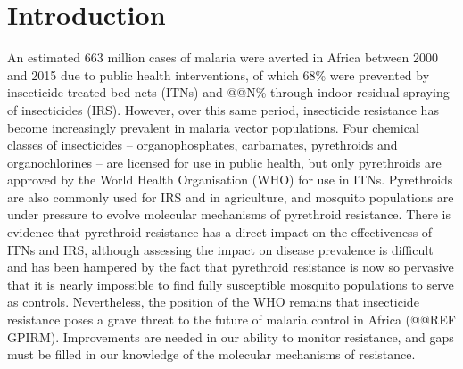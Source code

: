 \documentclass[a4paper,11pt,abstracton]{scrartcl}
\begin{document}
\section*{Introduction}

An estimated 663 million cases of malaria were averted in Africa between 2000 and 2015 due to public health interventions, of which 68\% were prevented by insecticide-treated bed-nets (ITNs) and @@N\% through indoor residual spraying of insecticides (IRS).
%
However, over this same period, insecticide resistance has become increasingly prevalent in malaria vector populations.
%
Four chemical classes of insecticides -- organophosphates, carbamates, pyrethroids and organochlorines -- are licensed for use in public health, but only pyrethroids are approved by the World Health Organisation (WHO) for use in ITNs.
%
Pyrethroids are also commonly used for IRS and in agriculture, and mosquito populations are under pressure to evolve molecular mechanisms of pyrethroid resistance.
%
There is evidence that pyrethroid resistance has a direct impact on the effectiveness of ITNs and IRS, although assessing the impact on disease prevalence is difficult and has been hampered by the fact that pyrethroid resistance is now so pervasive that it is nearly impossible to find fully susceptible mosquito populations to serve as controls.
%
Nevertheless, the position of the WHO remains that insecticide resistance poses a grave threat to the future of malaria control in Africa (@@REF GPIRM).
%
Improvements are needed in our ability to monitor resistance, and gaps must be filled in our knowledge of the molecular mechanisms of resistance.
\end{document}
